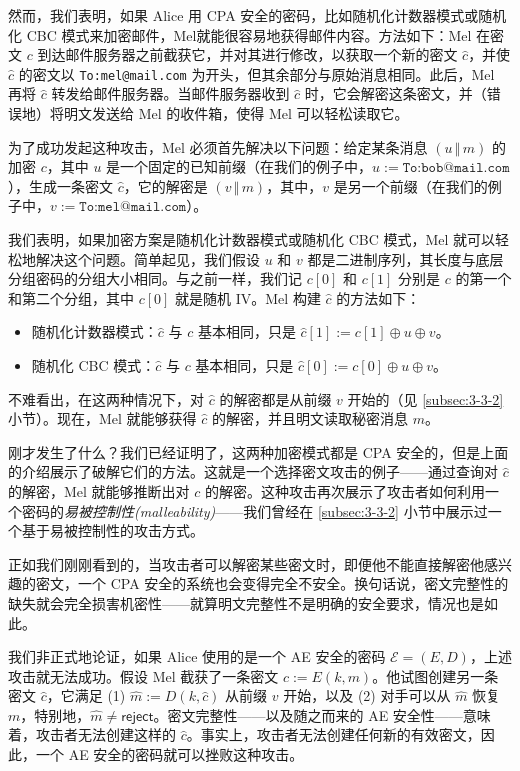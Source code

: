 然而，我们表明，如果 Alice 用 CPA 安全的密码，比如随机化计数器模式或随机化 CBC 模式来加密邮件，Mel就能很容易地获得邮件内容。方法如下：Mel 在密文 $c$ 到达邮件服务器之前截获它，并对其进行修改，以获取一个新的密文 $\hat{c}$，并使 $\hat{c}$ 的密文以 \texttt{To:mel@mail.com} 为开头，但其余部分与原始消息相同。此后，Mel 再将 $\hat{c}$ 转发给邮件服务器。当邮件服务器收到 $\hat{c}$ 时，它会解密这条密文，并（错误地）将明文发送给 Mel 的收件箱，使得 Mel 可以轻松读取它。

为了成功发起这种攻击，Mel 必须首先解决以下问题：给定某条消息 $(u\,\Vert\,m)$ 的加密 $c$，其中 $u$ 是一个固定的已知前缀（在我们的例子中，$u:=\texttt{To:bob@mail.com}$），生成一条密文 $\hat{c}$，它的解密是 $(v\,\Vert\,m)$，其中，$v$ 是另一个前缀（在我们的例子中，$v:=\texttt{To:mel@mail.com}$）。

我们表明，如果加密方案是随机化计数器模式或随机化 CBC 模式，Mel 就可以轻松地解决这个问题。简单起见，我们假设 $u$ 和 $v$ 都是二进制序列，其长度与底层分组密码的分组大小相同。与之前一样，我们记 $c[0]$ 和 $c[1]$ 分别是 $c$ 的第一个和第二个分组，其中 $c[0]$ 就是随机 IV。Mel 构建 $\hat{c}$ 的方法如下：
\begin{itemize}
	\item 随机化计数器模式：$\hat{c}$ 与 $c$ 基本相同，只是 $\hat{c}[1]:=c[1]\oplus u\oplus v$。
	\item 随机化 CBC 模式：$\hat{c}$ 与 $c$ 基本相同，只是 $\hat{c}[0]:=c[0]\oplus u\oplus v$。
\end{itemize}
不难看出，在这两种情况下，对 $\hat{c}$ 的解密都是从前缀 $v$ 开始的（见 \ref{subsec:3-3-2} 小节）。现在，Mel 就能够获得 $\hat{c}$ 的解密，并且明文读取秘密消息 $m$。

刚才发生了什么？我们已经证明了，这两种加密模式都是 CPA 安全的，但是上面的介绍展示了破解它们的方法。这就是一个选择密文攻击的例子——通过查询对 $\hat{c}$ 的解密，Mel 就能够推断出对 $c$ 的解密。这种攻击再次展示了攻击者如何利用一个密码的\emph{易被控制性(malleability)}——我们曾经在 \ref{subsec:3-3-2} 小节中展示过一个基于易被控制性的攻击方式。

正如我们刚刚看到的，当攻击者可以解密某些密文时，即便他不能直接解密他感兴趣的密文，一个 CPA 安全的系统也会变得完全不安全。换句话说，密文完整性的缺失就会完全损害机密性——就算明文完整性不是明确的安全要求，情况也是如此。

我们非正式地论证，如果 Alice 使用的是一个 AE 安全的密码 $\mathcal{E}=(E,D)$，上述攻击就无法成功。假设 Mel 截获了一条密文 $c:=E(k,m)$。他试图创建另一条密文 $\hat{c}$，它满足 (1) $\hat{m}:=D(k,\hat{c})$ 从前缀 $v$ 开始，以及 (2) 对手可以从 $\hat{m}$ 恢复 $m$，特别地，$\hat{m}\neq\mathsf{reject}$。密文完整性——以及随之而来的 AE 安全性——意味着，攻击者无法创建这样的 $\hat{c}$。事实上，攻击者无法创建任何新的有效密文，因此，一个 AE 安全的密码就可以挫败这种攻击。

